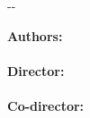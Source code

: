 {\begin{cambiamargen}{-\cambioIzquierdo}{-\cambioDerecho}
\begin{center}
\end{center}

\vfill

\begin{large}
\begin{center}
{\Large \bfseries Authors:}\\
\textbf{\autorPortadaVal}\\[0.2cm]
{\Large \bfseries Director:}\\
\textbf{\directorPortadaVal}\\[0.3cm]
{\Large \bfseries Co-director:}\\
\textbf{\codirectorPortadaVal}\\[0.2cm]
\textbf{\institucionVal}\\%
\end{center}
\end{large}

\vfill

\end{cambiamargen}

\newpage

\thispagestyle{empty}
\mbox{ }


\newpage

\thispagestyle{empty}

\mbox{ }

\begin{Huge}
\begin{center}
\tituloPortadaVal
\end{center}
\end{Huge}

}
